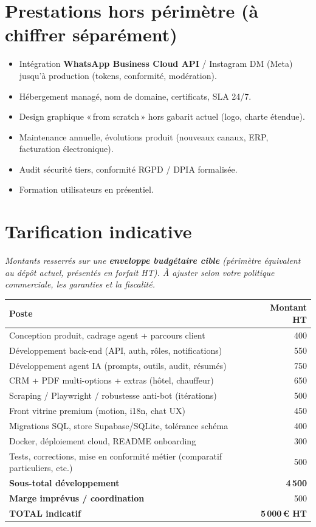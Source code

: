 \documentclass[11pt,a4paper]{article}
\begin{document}
\section{Prestations hors périmètre (à chiffrer séparément)}
\begin{itemize}[leftmargin=*]
  \item Intégration \textbf{WhatsApp Business Cloud API} / Instagram DM (Meta) jusqu'à production (tokens, conformité, modération).
  \item Hébergement managé, nom de domaine, certificats, SLA 24/7.
  \item Design graphique «\,from scratch\,» hors gabarit actuel (logo, charte étendue).
  \item Maintenance annuelle, évolutions produit (nouveaux canaux, ERP, facturation électronique).
  \item Audit sécurité tiers, conformité RGPD / DPIA formalisée.
  \item Formation utilisateurs en présentiel.
\end{itemize}

\section{Tarification indicative}

\textit{Montants resserrés sur une \textbf{enveloppe budgétaire cible} (périmètre équivalent au dépôt actuel, présentés en forfait HT). À ajuster selon votre politique commerciale, les garanties et la fiscalité.}

\vspace{0.6em}
\begin{table}[h]
\centering
\begin{tabular}{@{}p{7.8cm}r@{}}
\toprule
\textbf{Poste} & \textbf{Montant HT} \\
\midrule
Conception produit, cadrage agent + parcours client & 400 \\
Développement back-end (API, auth, rôles, notifications) & 550 \\
Développement agent IA (prompts, outils, audit, résumés) & 750 \\
CRM + PDF multi-options + extras (hôtel, chauffeur) & 650 \\
Scraping / Playwright / robustesse anti-bot (itérations) & 500 \\
Front vitrine premium (motion, i18n, chat UX) & 450 \\
Migrations SQL, store Supabase/SQLite, tolérance schéma & 400 \\
Docker, déploiement cloud, README onboarding & 300 \\
Tests, corrections, mise en conformité métier (comparatif particuliers, etc.) & 500 \\
\midrule
\textbf{Sous-total développement} & \textbf{4\,500} \\
\textbf{Marge imprévus / coordination} & 500 \\
\midrule
\textbf{TOTAL indicatif} & \textbf{5\,000\,\euro{} HT} \\
\bottomrule
\end{tabular}
\end{table}
\end{document}
